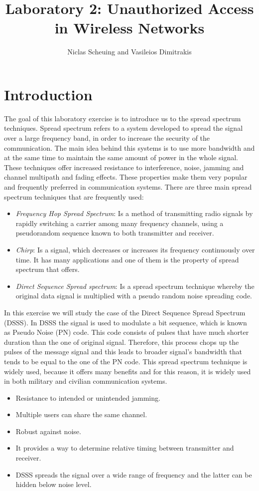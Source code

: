 \documentclass[12pt,a4paper]{article}
\title{Laboratory 2: Unauthorized Access in Wireless Networks}
\author{Niclas Scheuing and Vasileios Dimitrakis}
\begin{document}
	\maketitle
	
	\section{Introduction}
	The goal of this laboratory exercise is to introduce us to the spread spectrum techniques. Spread spectrum refers to a system developed to spread the signal over a large frequency band, in order to increase the security of the communication. The main idea behind this systems is to use more bandwidth and at the same time to maintain the same amount of power in the whole signal. These techniques offer increased resistance to interference, noise, jamming and channel multipath and fading effects. These properties make them very popular and frequently preferred in communication systems. 
	There are three main spread spectrum techniques that are frequently used:
	\begin{itemize}
	\item{\emph{Frequency Hop Spread Spectrum}: Is a method of transmitting radio signals by rapidly switching a carrier among many frequency channels, using a pseudorandom sequence known to both transmitter and receiver.}
	\item{\emph{Chirp}: Is a signal, which decreases or increases its frequency continuously over time. It has many applications and one of them is the property of spread spectrum that offers.}
	\item{\emph{Direct Sequence Spread spectrum}: Is a spread spectrum technique whereby the original data signal is multiplied with a pseudo random noise spreading code.}
	\end{itemize}
	
	In this exercise we will study the case of the Direct Sequence Spread Spectrum (DSSS).
	In DSSS the signal is used to modulate a bit sequence, which is known as Pseudo Noise (PN) code. This code consists of pulses that have much shorter duration than the one of original signal. Therefore, this process chops up the pulses of the message signal and this leads to broader signal's bandwidth that tends to be equal to the one of the PN code. 
	This spread spectrum technique is widely used, because it offers many benefits and for this reason, it is widely used in both military and civilian communication systems.
	
	\begin{itemize}
	\item{Resistance to intended or unintended jamming.}
	\item{Multiple users can share the same channel.}
	\item{Robust against noise.}
	\item{It provides a way to determine relative timing between transmitter and receiver.}
	\item{DSSS spreads the signal over a wide range of frequency and the latter can be hidden below noise level.}
	\end{itemize}
	
\end{document}
